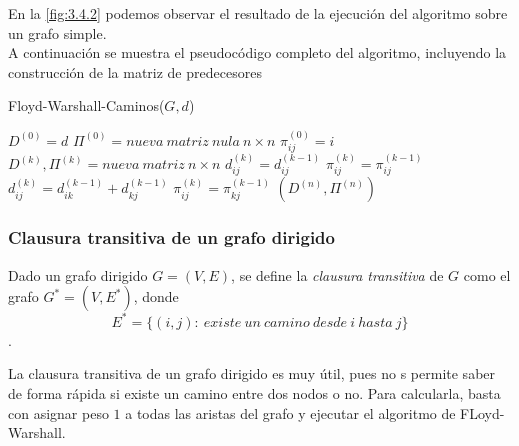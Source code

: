 En la \autoref{fig:3.4.2} podemos observar el resultado de la ejecución del algoritmo sobre un grafo simple. \\

A continuación se muestra el pseudocódigo completo del algoritmo, incluyendo la construcción de la matriz de predecesores

\begin{breakablealgorithm}
	\caption{Floyd-Warshall-Caminos($G,d$)}
	\begin{algorithmic}[1]
		\State $D^{(0)}=d$
		\State $\Pi^{(0)}=nueva\ matriz\ nula\ n\times n$
			\State $\pi_{ij}^{(0)}=i$
		\EndFor
			\State $D^{(k)},\Pi^{(k)}=nueva\ matriz\ n\times n$
						\State $d_{ij}^{(k)}=d_{ij}^{(k-1)}$
						\State $\pi_{ij}^{(k)}=\pi_{ij}^{(k-1)}$
					\Else
						\State $d_{ij}^{(k)}=d_{ik}^{(k-1)}+d_{kj}^{(k-1)}$
						\State $\pi_{ij}^{(k)}=\pi_{kj}^{(k-1)}$
					\EndIf
				\EndFor
			\EndFor
		\EndFor
		\Return $(D^{(n)},\Pi^{(n)})$
	\end{algorithmic}
\end{breakablealgorithm}

\subsubsection{Clausura transitiva de un grafo dirigido}

\begin{definicion}
	Dado un grafo dirigido $G=(V,E)$, se define la \textit{clausura transitiva} de $G$ como el grafo $G^*=(V,E^*)$, donde
	$$E^*=\{(i,j):\ existe\ un\ camino\ desde\ i\ hasta\ j\}$$.
\end{definicion}

La clausura transitiva de un grafo dirigido es muy útil, pues no s permite saber de forma rápida si existe un camino entre dos nodos o no. Para calcularla, basta con asignar peso $1$ a todas las aristas del grafo y ejecutar el algoritmo de FLoyd-Warshall. \\

